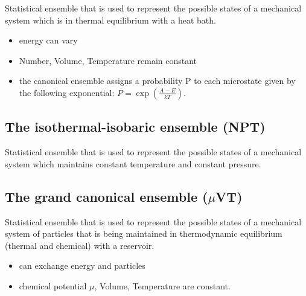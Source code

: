 \documentclass{scrartcl}
\begin{document}
Statistical ensemble that is used to represent the possible states of
a mechanical system which is in thermal equilibrium with a heat bath. 
\begin{itemize}
\item energy can vary
\item Number, Volume, Temperature remain constant
\item the canonical ensemble assigns a probability P to each
  microstate given by the following exponential: \(P =
  \exp(\frac{A-E}{kT})\). 
\end{itemize}

\subsection{The isothermal-isobaric ensemble (NPT)}
\label{sec:isoth-isob-ensemble}

Statistical ensemble that is used to represent the possible states of a
mechanical system which maintains constant temperature and constant
pressure. 

\subsection{The grand canonical ensemble (\(\mu\)VT)}
\label{sec:grand-canon-ensemble}

Statistical ensemble that is used to represent the possible states of a
mechanical system of particles that is being maintained in
thermodynamic equilibrium (thermal and chemical) with a reservoir. 
\begin{itemize}
\item can exchange energy and particles
\item chemical potential \(\mu\), Volume, Temperature are constant.
\end{itemize}
\end{document}
